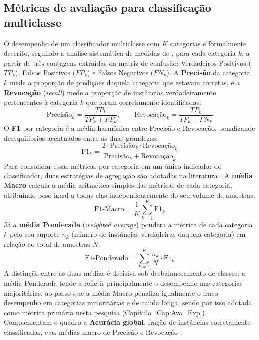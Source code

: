 \subsection{Métricas de avaliação para classificação multiclasse}
\label{sec:fund_metricas_classificacao}
O desempenho de um classificador multiclasse com $K$ categorias é formalmente descrito, seguindo a análise sistemática de medidas de , para cada categoria $k$, a partir de três contagens extraídas da matriz de confusão: Verdadeiros Positivos ($TP_k$), Falsos Positivos ($FP_k$) e Falsos Negativos ($FN_k$). A \textbf{Precisão} da categoria $k$ mede a proporção de predições daquela categoria que estavam corretas, e a \textbf{Revocação} (\textit{recall}) mede a proporção de instâncias verdadeiramente pertencentes à categoria $k$ que foram corretamente identificadas:
\begin{equation}
	\text{Precisão}_k = \frac{TP_k}{TP_k + FP_k}, \qquad
	\text{Revocação}_k = \frac{TP_k}{TP_k + FN_k}
\end{equation}
O \textbf{F1} por categoria é a média harmônica entre Precisão e Revocação, penalizando desequilíbrios acentuados entre as duas grandezas:
\begin{equation}
	\text{F1}_k = \frac{2 \cdot \text{Precisão}_k \cdot \text{Revocação}_k}{\text{Precisão}_k + \text{Revocação}_k}
\end{equation}
Para consolidar essas métricas por categoria em um único indicador do classificador, duas estratégias de agregação são adotadas na literatura \cite{sokolova2009systematic}. A \textbf{média Macro} calcula a média aritmética simples das métricas de cada categoria, atribuindo peso igual a todas elas independentemente do seu volume de amostras:
\begin{equation}
	\label{eq:f1_macro}
	\text{F1-Macro} = \frac{1}{K} \sum_{k=1}^{K} \text{F1}_k
\end{equation}
Já a \textbf{média Ponderada} (\textit{weighted average}) pondera a métrica de cada categoria $k$ pelo seu suporte $n_k$ (número de instâncias verdadeiras daquela categoria) em relação ao total de amostras $N$:
\begin{equation}
	\label{eq:f1_ponderado}
	\text{F1-Ponderado} = \sum_{k=1}^{K} \frac{n_k}{N} \cdot \text{F1}_k
\end{equation}
A distinção entre as duas médias é decisiva sob desbalanceamento de classes: a média Ponderada tende a refletir principalmente o desempenho nas categorias majoritárias, ao passo que a média Macro penaliza igualmente o fraco desempenho em categorias minoritárias e de cauda longa, sendo por isso adotada como métrica primária nesta pesquisa (Capítulo~\ref{Cap:Ava_Exp}). Complementam o quadro a \textbf{Acurácia global}, fração de instâncias corretamente classificadas, e as médias macro de Precisão e Revocação \cite{sokolova2009systematic}:
